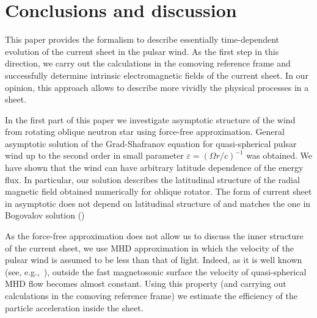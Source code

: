 \documentclass[useAMS,usenatbib]{mn2e}
\begin{document}
\section{Conclusions and discussion}
\label{sect:conc}

{ This paper provides the formalism to describe essentially time-dependent 
evolution of the current sheet in the pulsar wind. As the first step in this direction, 
we carry out the calculations in the comoving reference frame and successfully determine 
intrinsic electromagnetic fields of the current sheet. In our opinion, this approach 
allows to describe more vividly the physical processes in a sheet.}


In the first part of this paper we investigate asymptotic structure of the wind from 
rotating oblique neutron star using force-free approximation. {  General asymptotic 
solution of the Grad-Shafranov equation for quasi-spherical pulsar wind up to the second 
order in small parameter \mbox{$\varepsilon = (\Omega r/c)^{-1}$} was  obtained. We have 
shown that the wind can have arbitrary latitude dependence of the energy flux. In particular, 
our solution describes the latitudinal structure of the radial magnetic field obtained 
numerically for oblique rotator. The form of current sheet in asymptotic does not depend on latitudinal structure of and matches the one in Bogovalov solution (\citealt{1999A&A...349.1017B}) } 

{ As the force-free approximation does not allow us to discuss the inner structure 
of the current sheet, we use MHD approximation in which the velocity of the pulsar wind 
is assumed to be less than that of light. Indeed, as it is well known (see, 
e.g.,~\citealt{bes98}), outside the fast magnetosonic surface the velocity of 
quasi-spherical MHD flow becomes almost constant. Using this property (and carrying 
out calculations in the comoving reference frame) we estimate the efficiency of the 
particle acceleration inside the sheet.}
\end{document}
